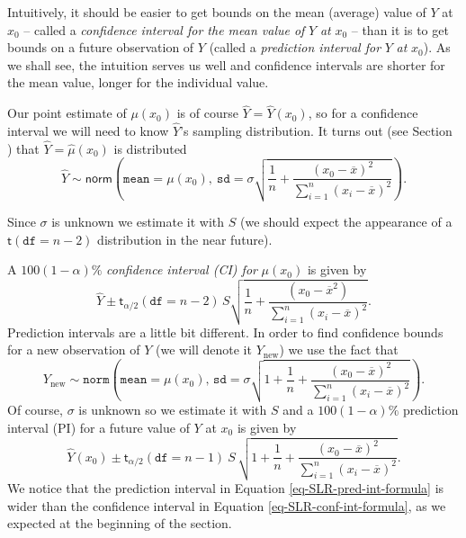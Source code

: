 \documentclass[captions=tableheading]{scrbook}
\begin{document}
Intuitively, it should be easier to get bounds on the mean (average) value of \(Y\) at \(x_{0}\) -- called a \emph{confidence interval for the mean value of} \(Y\) \emph{at} \(x_{0}\) -- than it is to get bounds on a future observation of \(Y\) (called a \emph{prediction interval for} \(Y\) \emph{at} \(x_{0}\)). As we shall see, the intuition serves us well and confidence intervals are shorter for the mean value, longer for the individual value.

Our point estimate of \(\mu(x_{0})\) is of course \(\hat{Y}=\hat{Y}(x_{0})\), so for a confidence interval we will need to know \(\hat{Y}\)'s sampling distribution. It turns out (see Section ) that \(\hat{Y}=\hat{\mu}(x_{0})\) is distributed
\begin{equation}
\hat{Y}\sim\mathsf{norm}\left(\mathtt{mean}=\mu(x_{0}),\:\mathtt{sd}=\sigma\sqrt{\frac{1}{n}+\frac{(x_{0}-\overline{x})^{2}}{\sum_{i=1}^{n}(x_{i}-\overline{x})^{2}}}\right).
\end{equation}

Since \(\sigma\) is unknown we estimate it with \(S\) (we should expect the appearance of a \(\mathsf{t}(\mathtt{df}=n-2)\) distribution in the near future). 

A \( 100(1-\alpha)\% \) \emph{confidence interval (CI) for} \(\mu(x_{0})\) is given by
\begin{equation}
\hat{Y}\pm\mathsf{t}_{\alpha/2}(\mathtt{df}=n-2)\, S\sqrt{\frac{1}{n}+\frac{(x_{0}-\overline{x}^{2})}{\sum_{i=1}^{n}(x_{i}-\overline{x})^{2}}}.\label{eq-SLR-conf-int-formula}
\end{equation}
Prediction intervals are a little bit different. In order to find confidence bounds for a new observation of \(Y\) (we will denote it \(Y_{\mbox{new}}\)) we use the fact that
\begin{equation}
Y_{\mbox{new}}\sim\mathtt{norm}\left(\mathtt{mean}=\mu(x_{0}),\,\mathtt{sd}=\sigma\sqrt{1+\frac{1}{n}+\frac{(x_{0}-\overline{x})^{2}}{\sum_{i=1}^{n}(x_{i}-\overline{x})^{2}}}\right).
\end{equation}
Of course, \(\sigma\) is unknown so we estimate it with \(S\) and a \( 100(1-\alpha)\% \) prediction interval (PI) for a future value of \(Y\) at \(x_{0}\) is given by 
\begin{equation}
\hat{Y}(x_{0})\pm\mathsf{t}_{\alpha/2}(\mathtt{df}=n-1)\: S\,\sqrt{1+\frac{1}{n}+\frac{(x_{0}-\overline{x})^{2}}{\sum_{i=1}^{n}(x_{i}-\overline{x})^{2}}}.\label{eq-SLR-pred-int-formula}
\end{equation}
We notice that the prediction interval in Equation \ref{eq-SLR-pred-int-formula} is wider than the confidence interval in Equation \ref{eq-SLR-conf-int-formula}, as we expected at the beginning of the section.
\end{document}
